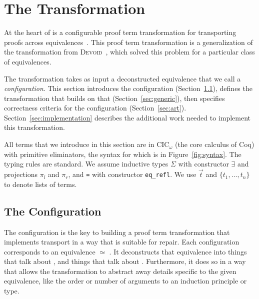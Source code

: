 \section{The Transformation}
\label{sec:key2}

At the heart of \toolname is a configurable proof term transformation for transporting
proofs across equivalences~. %
This proof term transformation is a generalization of the transformation from 
\textsc{Devoid}~\cite{Ringer2019}, which solved this problem for a particular class of equivalences.


The transformation takes as input a deconstructed equivalence that we call a \textit{configuration}.
This section introduces the configuration (Section~\ref{sec:configurable}),
defines the transformation that builds on that (Section~\ref{sec:generic}),
then specifies correctness criteria for the configuration (Section~\ref{sec:art}).
Section~\ref{sec:implementation} describes the additional work needed to implement this transformation.

All terms that we introduce in this section are in CIC$_{\omega}$ (the core calculus of Coq) with primitive eliminators,
the syntax for which is in Figure~\ref{fig:syntax}.
The typing rules are standard.
We assume inductive types $\Sigma$ with constructor $\exists$ and projections $\pi_l$ and $\pi_r$,
and \lstinline{=} with constructor \lstinline{eq_refl}.
We use $\vec{t}$ and $\{t_1, \ldots, t_n\}$ to denote lists of terms.

\subsection{The Configuration}
\label{sec:configurable}

The configuration is the key to building a proof term transformation that implements transport in a way that is suitable for repair.
Each configuration corresponds to an equivalence \A $\simeq$ \B.
It deconstructs that equivalence into things that talk about \A, and things that talk about \B.
Furthermore, it does so in a way that allows the transformation to abstract away details
specific to the given equivalence, like the order or number of arguments to an induction principle or type.

